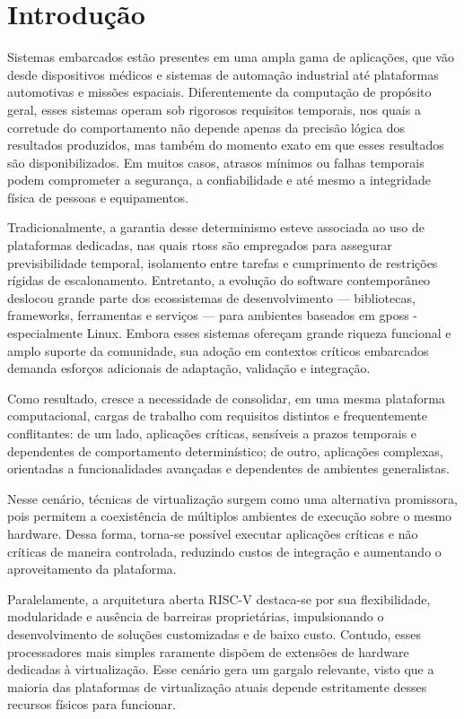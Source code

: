 \chapter{Introdução}

Sistemas embarcados estão presentes em uma ampla gama de aplicações, que vão desde dispositivos médicos e sistemas de automação industrial
até plataformas automotivas e missões espaciais. Diferentemente da computação de propósito geral, esses sistemas operam sob rigorosos requisitos
temporais, nos quais a corretude do comportamento não depende apenas da precisão lógica dos resultados produzidos, mas também do momento
exato em que esses resultados são disponibilizados. Em muitos casos, atrasos mínimos ou falhas temporais podem comprometer a segurança, a
confiabilidade e até mesmo a integridade física de pessoas e equipamentos.

Tradicionalmente, a garantia desse determinismo esteve associada ao uso de plataformas dedicadas, nas quais \glspl{rtos} são empregados para assegurar
previsibilidade temporal, isolamento entre tarefas e cumprimento de restrições rígidas de escalonamento. Entretanto, a evolução do software contemporâneo
deslocou grande parte dos ecossistemas de desenvolvimento — bibliotecas, frameworks, ferramentas e serviços — para ambientes baseados em \glspl{gpos} - 
especialmente Linux. Embora esses sistemas ofereçam grande riqueza funcional e amplo suporte da comunidade, sua adoção em contextos críticos embarcados demanda
esforços adicionais de adaptação, validação e integração.

Como resultado, cresce a necessidade de consolidar, em uma mesma plataforma computacional, cargas de trabalho com requisitos distintos e frequentemente
conflitantes: de um lado, aplicações críticas, sensíveis a prazos temporais e dependentes de comportamento determinístico; de outro, aplicações complexas,
orientadas a funcionalidades avançadas e dependentes de ambientes generalistas.

Nesse cenário, técnicas de virtualização surgem como uma alternativa promissora, pois permitem a coexistência de múltiplos ambientes de execução sobre o
mesmo hardware. Dessa forma, torna-se possível executar aplicações críticas e não críticas de maneira controlada, reduzindo custos de integração e
aumentando o aproveitamento da plataforma.

Paralelamente, a arquitetura aberta RISC-V destaca-se por sua flexibilidade, modularidade e ausência de barreiras proprietárias, impulsionando o desenvolvimento de soluções customizadas e de
baixo custo. Contudo, esses processadores mais simples raramente dispõem de extensões de hardware dedicadas à virtualização. Esse cenário gera um gargalo relevante, visto que a maioria das
plataformas de virtualização atuais depende estritamente desses recursos físicos para funcionar.

